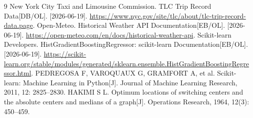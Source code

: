 \documentclass[UTF8,a4paper,12pt]{ctexart}
\begin{document}
\begin{thebibliography}{9}
 New York City Taxi and Limousine Commission. TLC Trip Record Data[DB/OL]. [2026-06-19]. \url{https://www.nyc.gov/site/tlc/about/tlc-trip-record-data.page}.
 Open-Meteo. Historical Weather API Documentation[EB/OL]. [2026-06-19]. \url{https://open-meteo.com/en/docs/historical-weather-api}.
 Scikit-learn Developers. HistGradientBoostingRegressor: scikit-learn Documentation[EB/OL]. [2026-06-19]. \url{https://scikit-learn.org/stable/modules/generated/sklearn.ensemble.HistGradientBoostingRegressor.html}.
 PEDREGOSA F, VAROQUAUX G, GRAMFORT A, et al. Scikit-learn: Machine Learning in Python[J]. Journal of Machine Learning Research, 2011, 12: 2825--2830.
 HAKIMI S L. Optimum locations of switching centers and the absolute centers and medians of a graph[J]. Operations Research, 1964, 12(3): 450--459.
\end{thebibliography}
\end{document}
